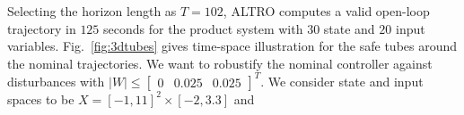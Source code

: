 
Selecting the horizon length as $T=102$, %
ALTRO computes a valid open-loop trajectory %
in $125$ seconds for the product system with $30$ state and $20$ input variables.  %
 Fig.~\ref{fig:3dtubes} gives time-space illustration for the safe tubes around the nominal trajectories. We want to robustify the nominal controller against disturbances with $|W|\leq \begin{bmatrix}0&0.025&0.025\end{bmatrix}^T$. We consider state and input spaces to be $X=[-1,11]^2\times[-2,3.3]$ and

